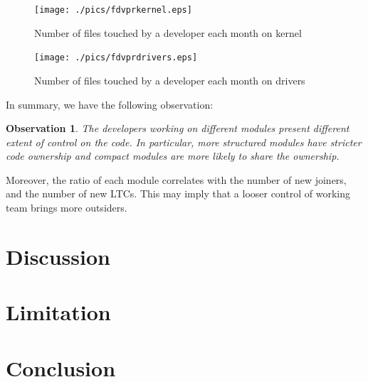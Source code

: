 \documentclass{sig-alternate-05-2015}
\newtheorem{observation}{\bf Observation}
\begin{document}
\begin{figure}
\centering
\texttt{[image: ./pics/fdvprkernel.eps]} %
\caption{Number of files touched by a developer each month on kernel}
\label{fig:productivitykernel}
\end{figure}

\begin{figure}
\centering
\texttt{[image: ./pics/fdvprdrivers.eps]} %
\caption{Number of files touched by a developer each month on drivers}
\label{fig:productivitydrivers}
\end{figure}

In summary, we have the following observation:
\begin{observation}\label{o:2}
\emph{The developers working on different modules present different extent of control
on the code. In particular, more structured modules have stricter code ownership
and compact modules are more likely to share the ownership.}
\end{observation}

Moreover, the ratio of each module correlates with the number of new joiners,
and the number of new LTCs. This may imply that a looser control of working team
brings more outsiders.

\section{Discussion}\label{s:discussion}

\section{Limitation}\label{s:limitation}

\section{Conclusion}\label{s:conclusion}



\end{document}

